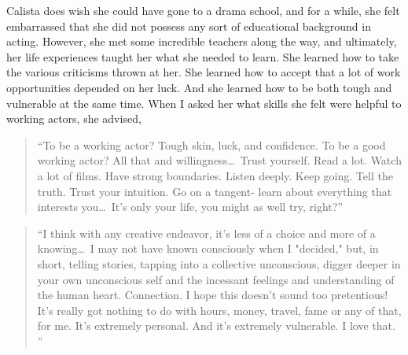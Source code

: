 \begin{multicols}{2}
	Calista does wish she could have gone to a drama school, and for a while, she felt embarrassed that she did not possess any sort of educational background in acting. However, she met some incredible teachers along the way, and ultimately, her life experiences taught her what she needed to learn. She learned how to take the various criticisms thrown at her. She learned how to accept that a lot of work opportunities depended on her luck. And she learned how to be both tough and vulnerable at the same time. When I asked her what skills she felt were helpful to working actors, she advised,
	\begin{quote}
		“To be a working actor? Tough skin, luck, and confidence. To be a good working actor? All that and willingness\ldots\ Trust yourself. Read a lot. Watch a lot of films. Have strong boundaries. Listen deeply. Keep going. Tell the truth. Trust your intuition. Go on a tangent- learn about everything that interests you\ldots\ It's only your life, you might as well try, right?”
	\end{quote}
	\begin{quote}
		“I think with any creative endeavor, it's less of a choice and more of a knowing\ldots\ I may not have known consciously when I "decided," but, in short, telling stories, tapping into a collective unconscious, digger deeper in your own unconscious self and the incessant feelings and understanding of the human heart. Connection. I hope this doesn't sound too pretentious! It's really got nothing to do with hours, money, travel, fame or any of that, for me. It's extremely personal. And it's extremely vulnerable. I love that. ”
	\end{quote}


\end{multicols}
